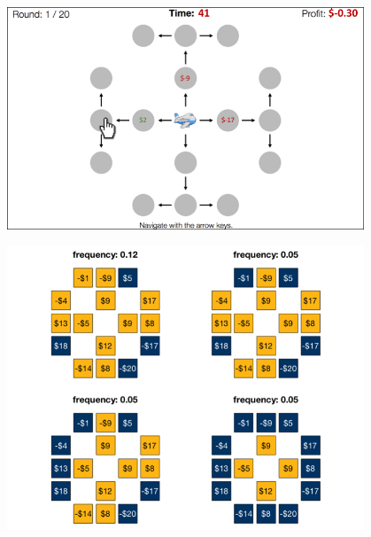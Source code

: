\documentclass[final]{beamer}
\newlength{\onecolwid}
\newlength{\twocolwid}
\begin{document}
\begin{frame}[t]
\begin{columns}[t]
\begin{column}{\twocolwid}
\begin{columns}[t,totalwidth=\twocolwid]
\begin{column}{\onecolwid}
      \begin{figure}
        \includegraphics[width=0.9\linewidth]{figs/paradigm_illustration1.png}
      \end{figure}
      
      \begin{figure}
        \includegraphics[width=0.9\linewidth]{figs/click_sets_trial4_noFB_small.png}
      
      \end{figure}
    \end{column} %

    \begin{column}{\onecolwid} %
     

\end{column}
\end{columns}
\end{column}
\end{columns}
\end{frame}
\end{document}
